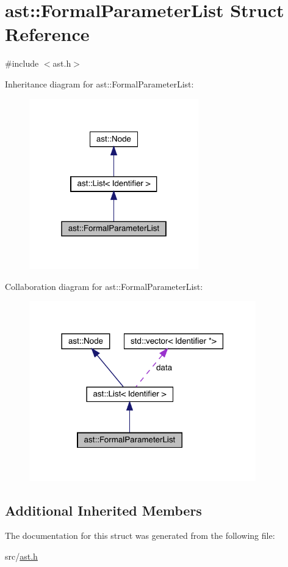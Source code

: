 \hypertarget{structast_1_1_formal_parameter_list}{}\section{ast\+:\+:Formal\+Parameter\+List Struct Reference}
\label{structast_1_1_formal_parameter_list}


{\ttfamily \#include $<$ast.\+h$>$}



Inheritance diagram for ast\+:\+:Formal\+Parameter\+List\+:\nopagebreak
\begin{figure}[H]
\begin{center}
\leavevmode
\includegraphics[width=208pt]{structast_1_1_formal_parameter_list__inherit__graph}
\end{center}
\end{figure}


Collaboration diagram for ast\+:\+:Formal\+Parameter\+List\+:\nopagebreak
\begin{figure}[H]
\begin{center}
\leavevmode
\includegraphics[width=278pt]{structast_1_1_formal_parameter_list__coll__graph}
\end{center}
\end{figure}
\subsection*{Additional Inherited Members}


The documentation for this struct was generated from the following file\+:\begin{DoxyCompactItemize}
\item 
src/\hyperlink{ast_8h}{ast.\+h}\end{DoxyCompactItemize}
